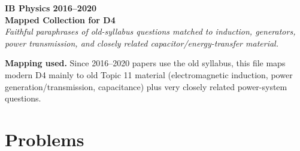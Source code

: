 \documentclass[11pt]{article}
\begin{document}
\begin{center}
{\LARGE \textbf{IB Physics 2016--2020}}\\
{\large \textbf{Mapped Collection for D4}}\\
\vspace{0.3em}
\textit{Faithful paraphrases of old-syllabus questions matched to induction, generators, power transmission, and closely related capacitor/energy-transfer material.}
\end{center}

\textbf{Mapping used.} Since 2016--2020 papers use the old syllabus, this file maps modern D4 mainly to old Topic 11 material (electromagnetic induction, power generation/transmission, capacitance) plus very closely related power-system questions.

\section*{Problems}
\end{document}
